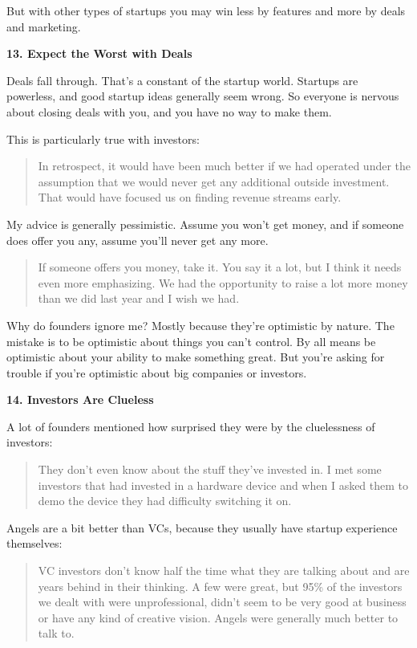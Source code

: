 But with other types of startups you may win less by features and more
by deals and marketing.

\textbf{13. Expect the Worst with Deals}

Deals fall through. That's a constant of the startup world. Startups are
powerless, and good startup ideas generally seem wrong. So everyone is
nervous about closing deals with you, and you have no way to make them.

This is particularly true with investors:

\begin{quote}
In retrospect, it would have been much better if we had operated under
the assumption that we would never get any additional outside
investment. That would have focused us on finding revenue streams early.
\end{quote}

My advice is generally pessimistic. Assume you won't get money, and if
someone does offer you any, assume you'll never get any more.

\begin{quote}
If someone offers you money, take it. You say it a lot, but I think it
needs even more emphasizing. We had the opportunity to raise a lot more
money than we did last year and I wish we had.
\end{quote}

Why do founders ignore me? Mostly because they're optimistic by nature.
The mistake is to be optimistic about things you can't control. By all
means be optimistic about your ability to make something great. But
you're asking for trouble if you're optimistic about big companies or
investors.

\textbf{14. Investors Are Clueless}

A lot of founders mentioned how surprised they were by the cluelessness
of investors:

\begin{quote}
They don't even know about the stuff they've invested in. I met some
investors that had invested in a hardware device and when I asked them
to demo the device they had difficulty switching it on.
\end{quote}

Angels are a bit better than VCs, because they usually have startup
experience themselves:

\begin{quote}
VC investors don't know half the time what they are talking about and
are years behind in their thinking. A few were great, but 95\% of the
investors we dealt with were unprofessional, didn't seem to be very good
at business or have any kind of creative vision. Angels were generally
much better to talk to.
\end{quote}

